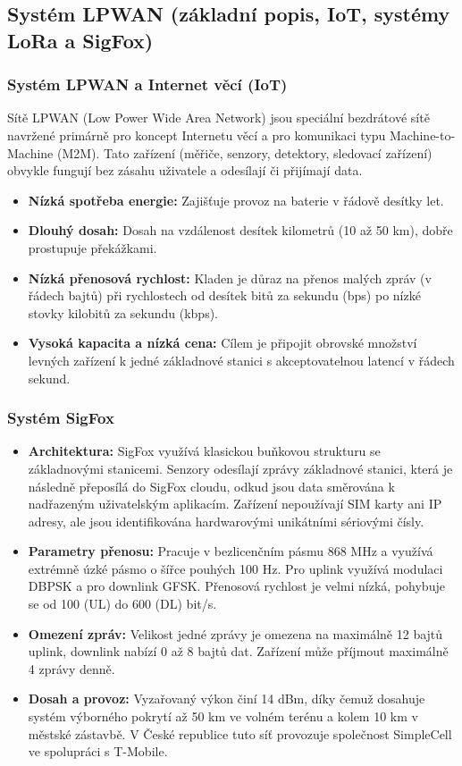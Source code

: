 	\subsection{Systém LPWAN (základní popis, IoT, systémy LoRa a SigFox)}
		\subsubsection{Systém LPWAN a Internet věcí (IoT)}
			Sítě LPWAN (Low Power Wide Area Network) jsou speciální bezdrátové sítě navržené primárně pro koncept Internetu věcí a pro komunikaci typu Machine-to-Machine (M2M). Tato zařízení (měřiče, senzory, detektory, sledovací zařízení) obvykle fungují bez zásahu uživatele a odesílají či přijímají data. 
			\begin{itemize}
				\item \textbf{Nízká spotřeba energie:} Zajišťuje provoz na baterie v řádově desítky let.
				\item \textbf{Dlouhý dosah:} Dosah na vzdálenost desítek kilometrů (10 až 50 km), dobře prostupuje překážkami.
				\item \textbf{Nízká přenosová rychlost:} Kladen je důraz na přenos malých zpráv (v řádech bajtů) při rychlostech od desítek bitů za sekundu (bps) po nízké stovky kilobitů za sekundu (kbps).
				\item \textbf{Vysoká kapacita a nízká cena:} Cílem je připojit obrovské množství levných zařízení k jedné základnové stanici s akceptovatelnou latencí v řádech sekund.
			\end{itemize}
		\subsubsection{Systém SigFox}
			\begin{itemize}
				\item \textbf{Architektura:} SigFox využívá klasickou buňkovou strukturu se základnovými stanicemi. Senzory odesílají zprávy základnové stanici, která je následně přeposílá do SigFox cloudu, odkud jsou data směrována k nadřazeným uživatelským aplikacím. Zařízení nepoužívají SIM karty ani IP adresy, ale jsou identifikována hardwarovými unikátními sériovými čísly.
				\item \textbf{Parametry přenosu:} Pracuje v bezlicenčním pásmu 868 MHz a využívá extrémně úzké pásmo o šířce pouhých 100 Hz. Pro uplink využívá modulaci DBPSK a pro downlink GFSK. Přenosová rychlost je velmi nízká, pohybuje se od 100 (UL) do 600 (DL) bit/s.
				\item \textbf{Omezení zpráv:} Velikost jedné zprávy je omezena na maximálně 12 bajtů uplink, downlink nabízí 0 až 8 bajtů dat. Zařízení může příjmout maximálně 4 zprávy denně.
				\item \textbf{Dosah a provoz:} Vyzařovaný výkon činí 14 dBm, díky čemuž dosahuje systém výborného pokrytí až 50 km ve volném terénu a kolem 10 km v městské zástavbě. V České republice tuto síť provozuje společnost SimpleCell ve spolupráci s T-Mobile.
			\end{itemize}
